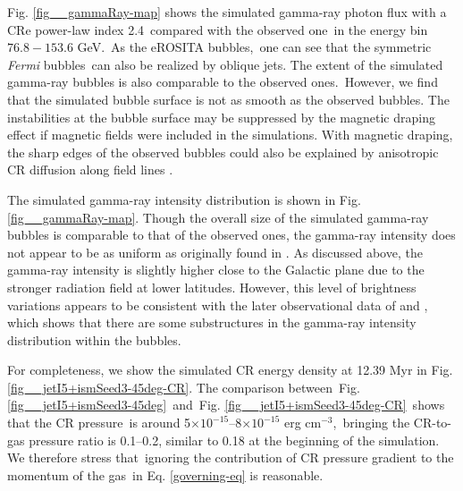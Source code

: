 \documentclass[fleqn,usenatbib,useAMS]{mnras}
\begin{document}
 Fig. \ref{fig__gammaRay-map} shows the simulated gamma-ray photon flux with a CRe power-law index 2.4\
 compared with the observed one\
 in the energy bin $76.8-153.6$ GeV.\
 As the eROSITA bubbles,\
 one can see that the symmetric \textit{Fermi} bubbles\
 can also be realized by oblique jets. The extent of the simulated gamma-ray bubbles is also comparable to the observed ones.\
 However, we find that the simulated bubble surface is not as smooth
 as the observed bubbles. The instabilities at the bubble
 surface may be suppressed by the magnetic draping
 effect \citep{Lyutikov2006,Yang2012} if magnetic fields were
 included in the simulations. With magnetic draping, the sharp edges of the observed bubbles \citep{Su2010, Ackermann2014} could also be explained by anisotropic CR diffusion along field lines \citep{Yang2013}.

 The simulated gamma-ray intensity
 distribution is shown in Fig. \ref{fig__gammaRay-map}. Though the overall size of the simulated gamma-ray bubbles is comparable to that of the observed ones, the gamma-ray intensity does not appear to be
 as uniform as originally found in \citet{Su2012}.
 As discussed above, the gamma-ray intensity is slightly
 higher close to the Galactic plane due to the stronger
 radiation field at lower latitudes. However, this level
 of brightness variations appears to be consistent with the later
 observational data of \citet{Ackermann2014} and \citet{Selig2015}, which shows that there are some substructures in the gamma-ray intensity distribution within the bubbles.

 For completeness, we show the simulated CR energy density at 12.39 Myr in Fig. \ref{fig__jetI5+ismSeed3-45deg-CR}. The comparison between\
 Fig. \ref{fig__jetI5+ismSeed3-45deg}\
 and\
 Fig. \ref{fig__jetI5+ismSeed3-45deg-CR}\
 shows that the CR pressure\
 is around 5$\times10^{-15}$--8$\times10^{-15}$ erg cm$^{-3}$,\
 bringing the CR-to-gas pressure ratio is 0.1--0.2,
 similar to 0.18 at the beginning of the simulation.
 We therefore stress that\
 ignoring the contribution of CR pressure gradient to the momentum of the gas\
 in Eq. \ref{governing-eq} is reasonable.
\end{document}
